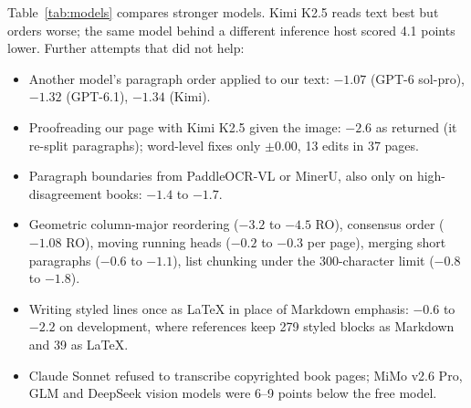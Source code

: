 \documentclass[11pt]{article}
\newcommand{\ro}{RO}
\begin{document}
Table~\ref{tab:models} compares stronger models. Kimi K2.5 reads text best but orders worse; the same model behind a different inference host scored 4.1 points lower. Further attempts that did not help:
\begin{itemize}
  \setlength\itemsep{0pt}
  \item Another model's paragraph order applied to our text: $-1.07$ (GPT-6 sol-pro), $-1.32$ (GPT-6.1), $-1.34$ (Kimi).
  \item Proofreading our page with Kimi K2.5 given the image: $-2.6$ as returned (it re-split paragraphs); word-level fixes only $\pm 0.00$, 13 edits in 37 pages.
  \item Paragraph boundaries from PaddleOCR-VL or MinerU, also only on high-disagreement books: $-1.4$ to $-1.7$.
  \item Geometric column-major reordering ($-3.2$ to $-4.5$ \ro), consensus order ($-1.08$ \ro), moving running heads ($-0.2$ to $-0.3$ per page), merging short paragraphs ($-0.6$ to $-1.1$), list chunking under the 300-character limit ($-0.8$ to $-1.8$).
  \item Writing styled lines once as LaTeX in place of Markdown emphasis: $-0.6$ to $-2.2$ on development, where references keep 279 styled blocks as Markdown and 39 as LaTeX.
  \item Claude Sonnet refused to transcribe copyrighted book pages; MiMo v2.6 Pro, GLM and DeepSeek vision models were 6--9 points below the free model.
\end{itemize}
\end{document}
